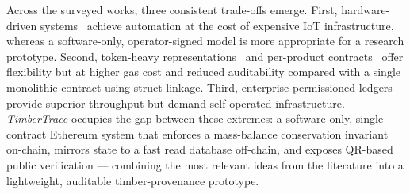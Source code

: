 Across the surveyed works, three consistent trade-offs emerge. First,
hardware-driven systems~\cite{figorilli2018wood} achieve automation at the
cost of expensive IoT infrastructure, whereas a software-only,
operator-signed model is more appropriate for a research prototype.
Second, token-heavy representations~\cite{westerkamp2018token,
smarttraceability} and per-product contracts~\cite{scts} offer flexibility
but at higher gas cost and reduced auditability compared with a single
monolithic contract using struct linkage. Third, enterprise permissioned
ledgers~\cite{hyperledger} provide superior throughput but demand
self-operated infrastructure. \emph{TimberTrace} occupies the gap between
these extremes: a software-only, single-contract Ethereum system that
enforces a mass-balance conservation invariant on-chain, mirrors state to
a fast read database off-chain, and exposes QR-based public verification
--- combining the most relevant ideas from the literature into a
lightweight, auditable timber-provenance prototype.


